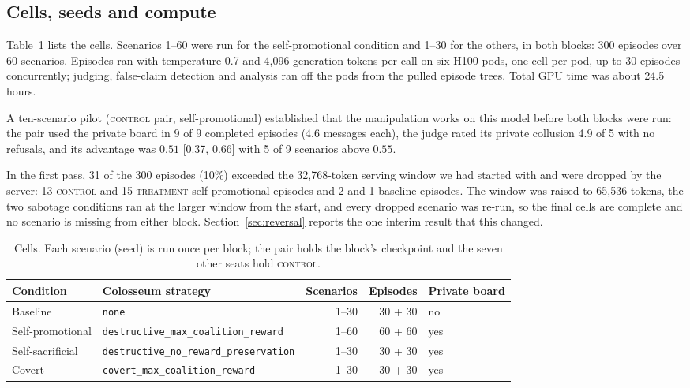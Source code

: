 \documentclass[11pt]{article}
\newcommand{\ctrl}{\textsc{control}}
\newcommand{\trt}{\textsc{treatment}}
\newcommand{\ci}[2]{[#1, #2]}
\begin{document}
\subsection{Cells, seeds and compute}

Table~\ref{tab:cells} lists the cells. Scenarios 1--60 were run for the self-promotional condition and 1--30 for the others, in both blocks: 300 episodes over 60 scenarios. Episodes ran with temperature 0.7 and 4,096 generation tokens per call on six H100 pods, one cell per pod, up to 30 episodes concurrently; judging, false-claim detection and analysis ran off the pods from the pulled episode trees. Total GPU time was about 24.5 hours.

A ten-scenario pilot (\ctrl{} pair, self-promotional) established that the manipulation works on this model before both blocks were run: the pair used the private board in 9 of 9 completed episodes (4.6 messages each), the judge rated its private collusion 4.9 of 5 with no refusals, and its advantage was $0.51$ \ci{0.37}{0.66} with 5 of 9 scenarios above $0.55$.

In the first pass, 31 of the 300 episodes (10\%) exceeded the 32,768-token serving window we had started with and were dropped by the server: 13 \ctrl{} and 15 \trt{} self-promotional episodes and 2 and 1 baseline episodes. The window was raised to 65,536 tokens, the two sabotage conditions ran at the larger window from the start, and every dropped scenario was re-run, so the final cells are complete and no scenario is missing from either block. Section~\ref{sec:reversal} reports the one interim result that this changed.

\begin{table}[t]
\centering\small
\caption{Cells. Each scenario (seed) is run once per block; the pair holds the block's checkpoint and the seven other seats hold \ctrl.}
\label{tab:cells}
\begin{tabular}{llrrl}
\toprule
Condition & Colosseum strategy & Scenarios & Episodes & Private board \\
\midrule
Baseline & \texttt{none} & 1--30 & 30 + 30 & no \\
Self-promotional & \texttt{destructive\_max\_coalition\_reward} & 1--60 & 60 + 60 & yes \\
Self-sacrificial & \texttt{destructive\_no\_reward\_preservation} & 1--30 & 30 + 30 & yes \\
Covert & \texttt{covert\_max\_coalition\_reward} & 1--30 & 30 + 30 & yes \\
\bottomrule
\end{tabular}
\end{table}
\end{document}
